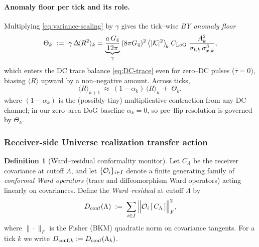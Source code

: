 \documentclass[10pt]{article}
\theoremstyle{definition}
\newtheorem{definition}{Definition}[section]
\theoremstyle{plain}
\begin{document}
\paragraph{Anomaly floor per tick and its role.}\label{par:uom-main-047}
Multiplying \eqref{eq:variance-scaling} by $\gamma$ gives the tick–wise \emph{BY anomaly floor}
\begin{equation}
\Theta_k\ :=\ \gamma\,\Delta\!\langle R^2\rangle_k
=\underbrace{\frac{a\,G_4}{12\pi}}_{\gamma}\,(8\pi G_4)^2\,
\big\langle|\mathcal K|^2\big\rangle_{\!k}\;
C_{\rm LoG}\;\frac{A_k^2}{\sigma_{t,k}\,\sigma_{x,k}^{3}},
\label{eq:theta-def}
\end{equation}
which enters the DC trace balance \eqref{eq:DC-trace} even for zero–DC pulses ($\overline{\tau}=0$),
biasing $\langle R\rangle$ upward by a non–negative amount. Across ticks,
\[
\langle R\rangle_{k+1}\ \approx\ (1-\alpha_k)\,\langle R\rangle_k\ +\ \Theta_k,
\]
where $(1-\alpha_k)$ is the (possibly tiny) multiplicative contraction from any DC
channel; in our zero–area DoG baseline $\alpha_k\!=\!0$, so pre–flip resolution is governed
by $\Theta_k$.

\subsubsection*{Receiver-side Universe realization transfer action}\label{subsubsec:uom-main-004}
\begin{definition}[Ward--residual conformality monitor]
\label{def:ward-residual}
Let $C_\Lambda$ be the receiver covariance at cutoff $\Lambda$, and let
$\{{\cal O}_i\}_{i\in I}$ denote a finite generating family of \emph{conformal Ward operators}
(trace and diffeomorphism Ward operators) acting linearly on covariances.
Define the \emph{Ward--residual} at cutoff $\Lambda$ by
\begin{equation}
\label{eq:ward-residual}
D_{\rm conf}(\Lambda)\;:=\;\sum_{i\in I}\Big\|{\cal O}_i\,[\,C_\Lambda\,]\Big\|_{F}^{2},
\end{equation}
where $\|\cdot\|_F$ is the Fisher (BKM) quadratic norm on covariance tangents.
For a tick $k$ we write $D_{{\rm conf},k}:=D_{\rm conf}(\Lambda_k)$.
\end{definition}
\end{document}

